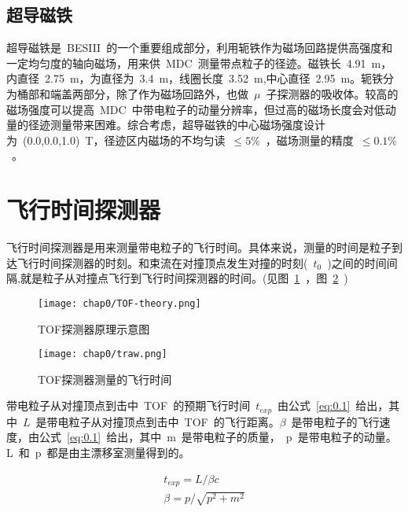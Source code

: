 \subsection{超导磁铁}

超导磁铁是~BESIII~的一个重要组成部分，利用轭铁作为磁场回路提供高强度和一定均匀度的轴向磁场，用来供~MDC~测量带点粒子的径迹。磁铁长~4.91~m，内直径~2.75~m，为直径为~3.4~m，线圈长度~3.52~m,中心直径~2.95~m。轭铁分为桶部和端盖两部分，除了作为磁场回路外，也做~$\mu$~子探测器的吸收体。较高的磁场强度可以提高~MDC~中带电粒子的动量分辨率，但过高的磁场长度会对低动量的径迹测量带来困难。综合考虑，超导磁铁的中心磁场强度设计为~(0.0,0.0,1.0)~T，径迹区内磁场的不均匀读~$\leq5\%$~，磁场测量的精度~$\leq0.1\%$~。

\section{飞行时间探测器}

飞行时间探测器是用来测量带电粒子的飞行时间。具体来说，测量的时间是粒子到达飞行时间探测器的时刻。和束流在对撞顶点发生对撞的时刻(~$t_{0}$~)之间的时间间隔,就是粒子从对撞点飞行到飞行时间探测器的时间。(见图~\ref{fig:TOF-theory}~，图~\ref{fig:traw}~)

\begin{figure}[!h]
  \centering
  \texttt{[image: chap0/TOF-theory.png]}
  \caption{TOF探测器原理示意图}
  \label{fig:TOF-theory}
\end{figure}

\begin{figure}[!h]
  \centering
  \texttt{[image: chap0/traw.png]}
  \caption{TOF探测器测量的飞行时间}
  \label{fig:traw}
\end{figure}

带电粒子从对撞顶点到击中~TOF~的预期飞行时间~$t_{exp}$~由公式~\ref{eq:0.1}~给出，其中~$L$~是带电粒子从对撞顶点到击中~TOF~的飞行距离。$\beta$~是带电粒子的飞行速度，由公式~\ref{eq:0.1}~给出，其中~m~是带电粒子的质量，~p~是带电粒子的动量。L~和~p~都是由主漂移室测量得到的。

\begin{align}
t_{exp}=L/\beta c 
\label{eq:0.1}\\
\beta=p/\sqrt {p^{2}+m^{2}}
\label{eq:0.2}
\end{align}

